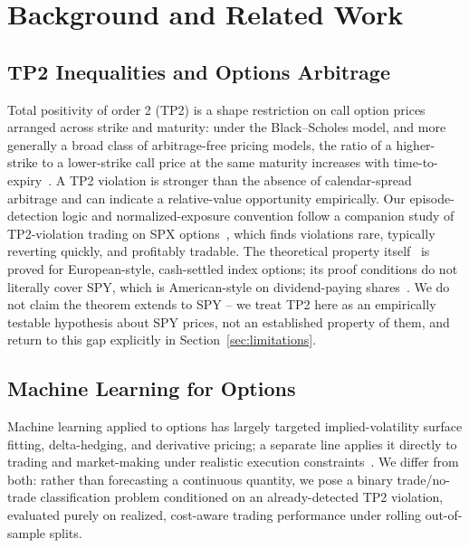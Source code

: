 \documentclass[sigconf,review,anonymous]{acmart}
\begin{document}
\section{Background and Related Work}
\label{sec:related}

\subsection{TP2 Inequalities and Options Arbitrage}
Total positivity of order 2 (TP2) is a shape restriction on call option prices arranged across strike and maturity: under the Black--Scholes model, and more generally a broad class of arbitrage-free pricing models, the ratio of a higher-strike to a lower-strike call price at the same maturity increases with time-to-expiry~\cite{glasserman2026tp2theory,glasserman2023convexity}. A TP2 violation is stronger than the absence of calendar-spread arbitrage and can indicate a relative-value opportunity empirically. Our episode-detection logic and normalized-exposure convention follow a companion study of TP2-violation trading on SPX options~\cite{glasserman2025tp2}, which finds violations rare, typically reverting quickly, and profitably tradable. The theoretical property itself~\cite{glasserman2026tp2theory} is proved for European-style, cash-settled index options; its proof conditions do not literally cover SPY, which is American-style on dividend-paying shares~\cite{cosma2020earlyexercise}. We do not claim the theorem extends to SPY -- we treat TP2 here as an empirically testable hypothesis about SPY prices, not an established property of them, and return to this gap explicitly in Section~\ref{sec:limitations}.

\subsection{Machine Learning for Options}
Machine learning applied to options has largely targeted implied-volatility surface fitting, delta-hedging, and derivative pricing; a separate line applies it directly to trading and market-making under realistic execution constraints~\cite{kearns2013mlmicrostructure}. We differ from both: rather than forecasting a continuous quantity, we pose a binary trade/no-trade classification problem conditioned on an already-detected TP2 violation, evaluated purely on realized, cost-aware trading performance under rolling out-of-sample splits.
\end{document}
